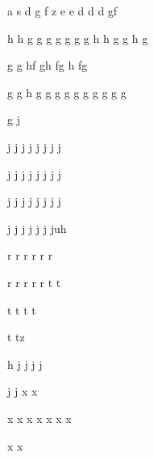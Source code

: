 a
s
d
g
f
z
e
e
d
d
d
gf

h
h
g
g
g
g
g
g
g
h
h
g
g
h
g


g
g
hf
gh
fg
h
fg

g
g
h
g
g
g
g
g
g
g
g
g
g

g
j

j
j
j
j
j
j
j
j

j
j
j
j
j
j
j
j

j
j
j
j
j
j
j
j

j
j
j
j
j
j
juh

r
r
r
r
r
r

r
r
r
r
r
t
t

t
t
t
t

t
tz

h
j
j
j
j

j
j
x
x

x
x
x
x
x
x
x

x
x
